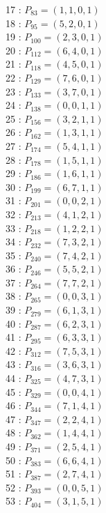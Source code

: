 \documentclass{article}
\begin{document}
{\begin{multicols}{3}
17 : $P_{83}=( 1, 1, 0, 1 )$\\
18 : $P_{95}=( 5, 2, 0, 1 )$\\
19 : $P_{100}=( 2, 3, 0, 1 )$\\
20 : $P_{112}=( 6, 4, 0, 1 )$\\
21 : $P_{118}=( 4, 5, 0, 1 )$\\
22 : $P_{129}=( 7, 6, 0, 1 )$\\
23 : $P_{133}=( 3, 7, 0, 1 )$\\
24 : $P_{138}=( 0, 0, 1, 1 )$\\
25 : $P_{156}=( 3, 2, 1, 1 )$\\
26 : $P_{162}=( 1, 3, 1, 1 )$\\
27 : $P_{174}=( 5, 4, 1, 1 )$\\
28 : $P_{178}=( 1, 5, 1, 1 )$\\
29 : $P_{186}=( 1, 6, 1, 1 )$\\
30 : $P_{199}=( 6, 7, 1, 1 )$\\
31 : $P_{201}=( 0, 0, 2, 1 )$\\
32 : $P_{213}=( 4, 1, 2, 1 )$\\
33 : $P_{218}=( 1, 2, 2, 1 )$\\
34 : $P_{232}=( 7, 3, 2, 1 )$\\
35 : $P_{240}=( 7, 4, 2, 1 )$\\
36 : $P_{246}=( 5, 5, 2, 1 )$\\
37 : $P_{264}=( 7, 7, 2, 1 )$\\
38 : $P_{265}=( 0, 0, 3, 1 )$\\
39 : $P_{279}=( 6, 1, 3, 1 )$\\
40 : $P_{287}=( 6, 2, 3, 1 )$\\
41 : $P_{295}=( 6, 3, 3, 1 )$\\
42 : $P_{312}=( 7, 5, 3, 1 )$\\
43 : $P_{316}=( 3, 6, 3, 1 )$\\
44 : $P_{325}=( 4, 7, 3, 1 )$\\
45 : $P_{329}=( 0, 0, 4, 1 )$\\
46 : $P_{344}=( 7, 1, 4, 1 )$\\
47 : $P_{347}=( 2, 2, 4, 1 )$\\
48 : $P_{362}=( 1, 4, 4, 1 )$\\
49 : $P_{371}=( 2, 5, 4, 1 )$\\
50 : $P_{383}=( 6, 6, 4, 1 )$\\
51 : $P_{387}=( 2, 7, 4, 1 )$\\
52 : $P_{393}=( 0, 0, 5, 1 )$\\
53 : $P_{404}=( 3, 1, 5, 1 )$\\

\end{multicols}}
\end{document}

